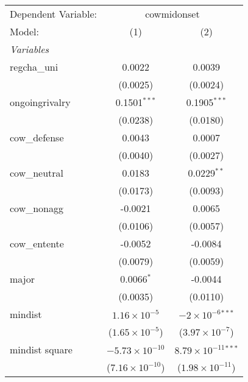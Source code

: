 
\begingroup
\centering
\begin{tabular}{lcc}
   \tabularnewline \midrule \midrule
   Dependent Variable: & \multicolumn{2}{c}{cowmidonset}\\
   Model:                                & (1)                      & (2)\\  
   \midrule
   \emph{Variables}\\
   regcha\_uni                           & 0.0022                   & 0.0039\\   
                                         & (0.0025)                 & (0.0024)\\   
   ongoingrivalry                        & 0.1501$^{***}$           & 0.1905$^{***}$\\   
                                         & (0.0238)                 & (0.0180)\\   
   cow\_defense                          & 0.0043                   & 0.0007\\   
                                         & (0.0040)                 & (0.0027)\\   
   cow\_neutral                          & 0.0183                   & 0.0229$^{**}$\\   
                                         & (0.0173)                 & (0.0093)\\   
   cow\_nonagg                           & -0.0021                  & 0.0065\\   
                                         & (0.0106)                 & (0.0057)\\   
   cow\_entente                          & -0.0052                  & -0.0084\\   
                                         & (0.0079)                 & (0.0059)\\   
   major                                 & 0.0066$^{*}$             & -0.0044\\   
                                         & (0.0035)                 & (0.0110)\\   
   mindist                               & $1.16\times 10^{-5}$     & $-2\times 10^{-6}$$^{***}$\\    
                                         & ($1.65\times 10^{-5}$)   & ($3.97\times 10^{-7}$)\\    
   mindist square                        & $-5.73\times 10^{-10}$   & $8.79\times 10^{-11}$$^{***}$\\    
                                         & ($7.16\times 10^{-10}$)  & ($1.98\times 10^{-11}$)\\    

\end{tabular}
